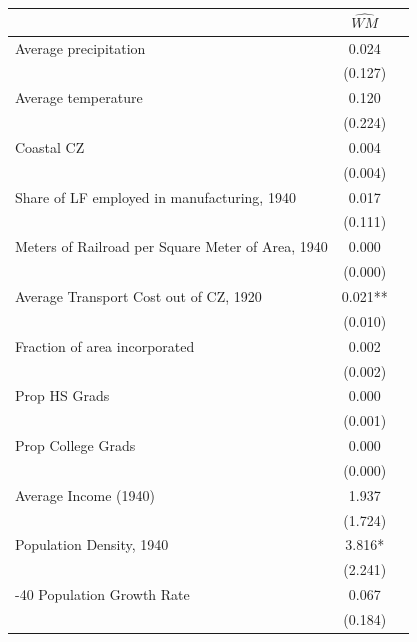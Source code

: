  \begin{tabular}{l*{2}{c}} \toprule
                &\multicolumn{1}{c}{$\widehat{WM}$}\\
\midrule
Average precipitation&    0.024   \\
                &  (0.127)   \\
\addlinespace
Average temperature&    0.120   \\
                &  (0.224)   \\
\addlinespace
Coastal CZ      &    0.004   \\
                &  (0.004)   \\
\addlinespace
Share of LF employed in manufacturing, 1940&    0.017   \\
                &  (0.111)   \\
\addlinespace
Meters of Railroad per Square Meter of Area, 1940&    0.000   \\
                &  (0.000)   \\
\addlinespace
Average Transport Cost out of CZ, 1920&    0.021** \\
                &  (0.010)   \\
\addlinespace
Fraction of area incorporated&    0.002   \\
                &  (0.002)   \\
\addlinespace
Prop HS Grads   &    0.000   \\
                &  (0.001)   \\
\addlinespace
Prop College Grads&    0.000   \\
                &  (0.000)   \\
\addlinespace
Average Income (1940)&    1.937   \\
                &  (1.724)   \\
\addlinespace
Population Density, 1940&    3.816*  \\
                &  (2.241)   \\
\addlinespace
1930-40 Population Growth Rate&    0.067   \\
                &  (0.184)   \\
       \bottomrule \end{tabular}
